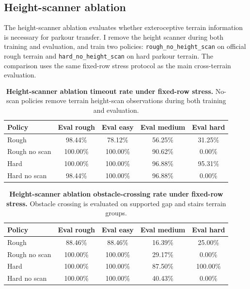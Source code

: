 \documentclass{article}
\begin{document}
\subsection{Height-scanner ablation}

The height-scanner ablation evaluates whether exteroceptive terrain information is necessary for parkour transfer. I remove the height scanner during both training and evaluation, and train two policies: \texttt{rough\_no\_height\_scan} on official rough terrain and \texttt{hard\_no\_height\_scan} on hard parkour terrain. The comparison uses the same fixed-row stress protocol as the main cross-terrain evaluation.

\begin{table}[t]
    \caption{\textbf{Height-scanner ablation timeout rate under fixed-row stress.} No-scan policies remove terrain height-scan observations during both training and evaluation.}
    \label{tab:height-scan-timeout}
    \centering
    \begin{tabular}{lcccc}
        \toprule
        Policy & Eval rough & Eval easy & Eval medium & Eval hard \\
        \midrule
        Rough & 98.44\% & 78.12\% & 56.25\% & 31.25\% \\
        Rough no scan & 100.00\% & 100.00\% & 90.62\% & 0.00\% \\
        Hard & 100.00\% & 100.00\% & 96.88\% & 95.31\% \\
        Hard no scan & 98.44\% & 100.00\% & 96.88\% & 0.00\% \\
        \bottomrule
    \end{tabular}
\end{table}

\begin{table}[t]
    \caption{\textbf{Height-scanner ablation obstacle-crossing rate under fixed-row stress.} Obstacle crossing is evaluated on supported gap and stairs terrain groups.}
    \label{tab:height-scan-obstacle}
    \centering
    \begin{tabular}{lcccc}
        \toprule
        Policy & Eval rough & Eval easy & Eval medium & Eval hard \\
        \midrule
        Rough & 88.46\% & 88.46\% & 16.39\% & 25.00\% \\
        Rough no scan & 100.00\% & 100.00\% & 29.17\% & 0.00\% \\
        Hard & 100.00\% & 100.00\% & 87.50\% & 100.00\% \\
        Hard no scan & 100.00\% & 100.00\% & 40.43\% & 0.00\% \\
        \bottomrule
    \end{tabular}
\end{table}
\end{document}
